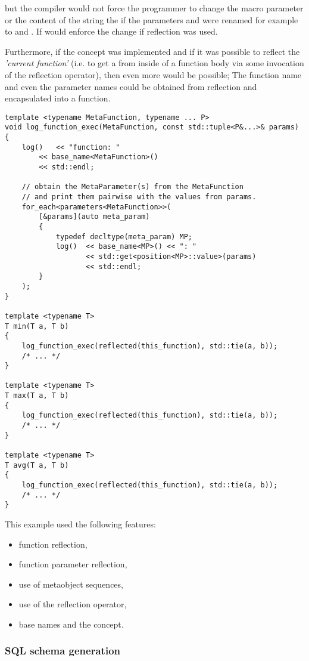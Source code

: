 but the compiler would not force the programmer to change the macro parameter
or the content of the string the if the parameters \verb@a@ and \verb@b@ were renamed
for example to \verb@first@ and \verb@second@. If would enforce the change if
reflection was used.

Furthermore, if the  concept was implemented
and if it was possible to reflect the {\em 'current function'} (i.e. to get a 
from inside of a function body via some invocation of the reflection operator),
then even more would be possible; The function name and even the parameter names could
be obtained from reflection and encapsulated into a function.

\begin{verbatim}
template <typename MetaFunction, typename ... P>
void log_function_exec(MetaFunction, const std::tuple<P&...>& params)
{
	log()   << "function: "
		<< base_name<MetaFunction>()
		<< std::endl;

	// obtain the MetaParameter(s) from the MetaFunction
	// and print them pairwise with the values from params.
	for_each<parameters<MetaFunction>>(
		[&params](auto meta_param)
		{
			typedef decltype(meta_param) MP;
			log()  << base_name<MP>() << ": "
			       << std::get<position<MP>::value>(params)
			       << std::endl;
		}
	);
}

template <typename T>
T min(T a, T b)
{
	log_function_exec(reflected(this_function), std::tie(a, b));
	/* ... */
}

template <typename T>
T max(T a, T b)
{
	log_function_exec(reflected(this_function), std::tie(a, b));
	/* ... */
}

template <typename T>
T avg(T a, T b)
{
	log_function_exec(reflected(this_function), std::tie(a, b));
	/* ... */
}
\end{verbatim}

This example used the following features:

\begin{itemize}
\item{function reflection,}
\item{function parameter reflection,}
\item{use of metaobject sequences,}
\item{use of the reflection operator,}
\item{base names and the  concept.}
\end{itemize}

\subsubsection{SQL schema generation}

